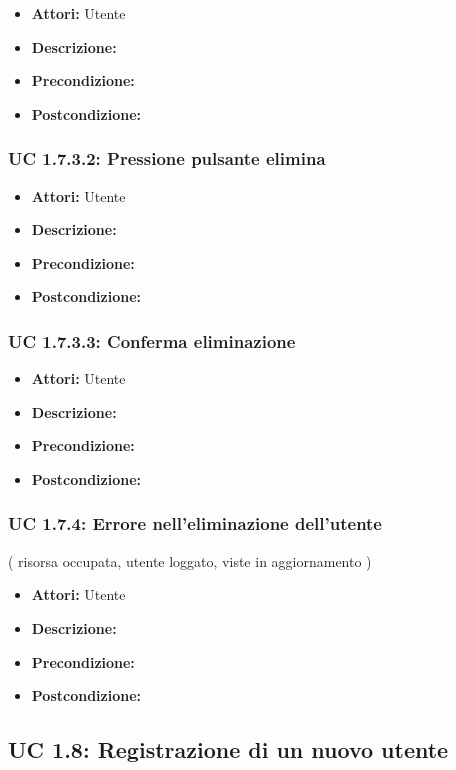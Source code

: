 \begin{itemize}
\item \textbf{Attori:} Utente
\item \textbf{Descrizione:} 
\item \textbf{Precondizione:} 
\item \textbf{Postcondizione:} 
\end{itemize}

\subsubsection{UC 1.7.3.2: Pressione pulsante elimina}

\begin{itemize}
\item \textbf{Attori:} Utente
\item \textbf{Descrizione:} 
\item \textbf{Precondizione:} 
\item \textbf{Postcondizione:} 
\end{itemize}

\subsubsection{UC 1.7.3.3: Conferma eliminazione}

\begin{itemize}
\item \textbf{Attori:} Utente
\item \textbf{Descrizione:} 
\item \textbf{Precondizione:} 
\item \textbf{Postcondizione:} 
\end{itemize}

\subsubsection{UC 1.7.4: Errore nell’eliminazione dell'utente}
( risorsa occupata, utente loggato, viste in aggiornamento )

\begin{itemize}
\item \textbf{Attori:} Utente
\item \textbf{Descrizione:} 
\item \textbf{Precondizione:} 
\item \textbf{Postcondizione:} 
\end{itemize}

\subsection{UC 1.8: Registrazione di un nuovo utente}

